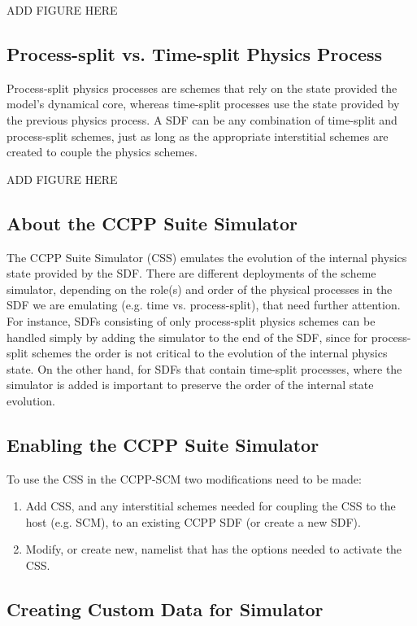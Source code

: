 ADD FIGURE HERE

\subsection{Process-split vs. Time-split Physics Process}

Process-split physics processes are schemes that rely on the state provided the model's dynamical core, whereas time-split processes use the state provided by the previous physics process. A SDF can be any combination of time-split and process-split schemes, just as long as the appropriate interstitial schemes are created to couple the physics schemes.

ADD FIGURE HERE

\subsection{About the CCPP Suite Simulator}

The CCPP Suite Simulator (CSS) emulates the evolution of the internal physics state provided by the SDF. There are different deployments of the scheme simulator, depending on the role(s) and order of the physical processes in the SDF we are emulating (e.g. time vs. process-split), that need further attention. For instance, SDFs consisting of only process-split physics schemes can be handled simply by adding the simulator to the end of the SDF, since for process-split schemes the order is not critical to the evolution of the internal physics state. On the other hand, for SDFs that contain time-split processes, where the simulator is added is important to preserve the order of the internal state evolution.

\subsection{Enabling the CCPP Suite Simulator}

To use the CSS in the CCPP-SCM two modifications need to be made:

\begin{enumerate}
\item Add CSS, and any interstitial schemes needed for coupling the CSS to the host (e.g. SCM), to an existing CCPP SDF (or create a new SDF).
\item Modify, or create new, namelist that has the options needed to activate the CSS.
\end{enumerate}

\subsection{Creating Custom Data for Simulator}

